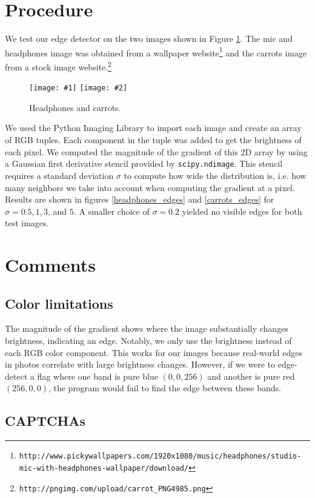 \documentclass{article}
\theoremstyle{definition}
\newcommand{\sbsplop}[4]{
    \begin{figure}\centering
        \texttt{[image: \#1]}
        \texttt{[image: \#2]}
        \caption{\label{#1}#3}
        {#4}
    \end{figure}
}
\begin{document}
\section{Procedure}

We test our edge detector on the two images shown in Figure
\ref{headphones.jpg}.
The mic and headphones image was obtained from a wallpaper
website\footnote{\texttt{http://www.pickywallpapers.com/1920x1080/music/headphones/studio-mic-with-headphones-wallpaper/download/}}
and the carrots image from a stock image website.\footnote{\texttt{http://pngimg.com/upload/carrot_PNG4985.png}}
\sbsplop{headphones.jpg}{carrots.png}{Headphones and carrots.}{}

We used the Python Imaging Library to import each image and create an
array of RGB tuples. Each component in the tuple was added to get the
brightness of each pixel. We computed the magnitude of the gradient
of this 2D array by using a Gaussian first derivative stencil provided by
\texttt{scipy.ndimage}. This stencil requires a standard deviation $\sigma$
to compute how wide the distribution is, i.e. how many neighbors we take
into account when computing the gradient at a pixel. Results are
shown in figures \ref{headphones_edges} and \ref{carrots_edges}
for $\sigma = 0.5, 1, 3$, and $5$. A smaller choice of $\sigma = 0.2$ yielded
no visible edges for both test images.

\section{Comments}

\subsection{Color limitations}

The magnitude of the gradient shows where the image substantially changes
brightness, indicating an edge. Notably, we only use the brightness
instead of each RGB color component. This works for our images because
real-world edges in photos correlate with large brightness changes. However,
if we were to edge-detect a flag where one band is pure blue $(0, 0, 256)$
and another is pure red $(256, 0, 0)$, the program would fail to find
the edge between these bands.

\subsection{CAPTCHAs}
\end{document}
